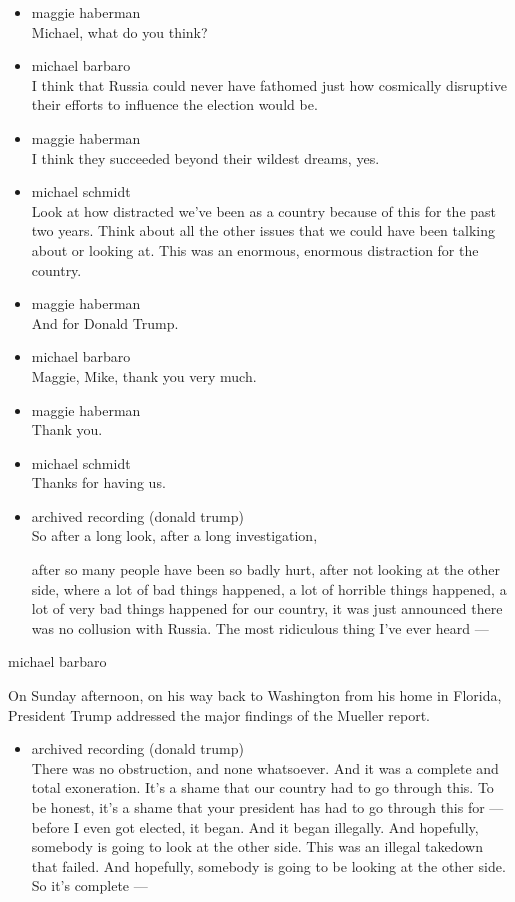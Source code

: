 \begin{itemize}
\item
  maggie haberman\\
  Michael, what do you think?
\item
  michael barbaro\\
  I think that Russia could never have fathomed just how cosmically
  disruptive their efforts to influence the election would be.
\item
  maggie haberman\\
  I think they succeeded beyond their wildest dreams, yes.
\item
  michael schmidt\\
  Look at how distracted we've been as a country because of this for the
  past two years. Think about all the other issues that we could have
  been talking about or looking at. This was an enormous, enormous
  distraction for the country.
\item
  maggie haberman\\
  And for Donald Trump.
\item
  michael barbaro\\
  Maggie, Mike, thank you very much.
\item
  maggie haberman\\
  Thank you.
\item
  michael schmidt\\
  Thanks for having us.
\item
  archived recording (donald trump)\\
  So after a long look, after a long investigation,

  after so many people have been so badly hurt, after not looking at the
  other side, where a lot of bad things happened, a lot of horrible
  things happened, a lot of very bad things happened for our country, it
  was just announced there was no collusion with Russia. The most
  ridiculous thing I've ever heard ---
\end{itemize}

michael barbaro

On Sunday afternoon, on his way back to Washington from his home in
Florida, President Trump addressed the major findings of the Mueller
report.

\begin{itemize}
\tightlist
\item
  archived recording (donald trump)\\
  There was no obstruction, and none whatsoever. And it was a complete
  and total exoneration. It's a shame that our country had to go through
  this. To be honest, it's a shame that your president has had to go
  through this for --- before I even got elected, it began. And it began
  illegally. And hopefully, somebody is going to look at the other side.
  This was an illegal takedown that failed. And hopefully, somebody is
  going to be looking at the other side. So it's complete ---
\end{itemize}

